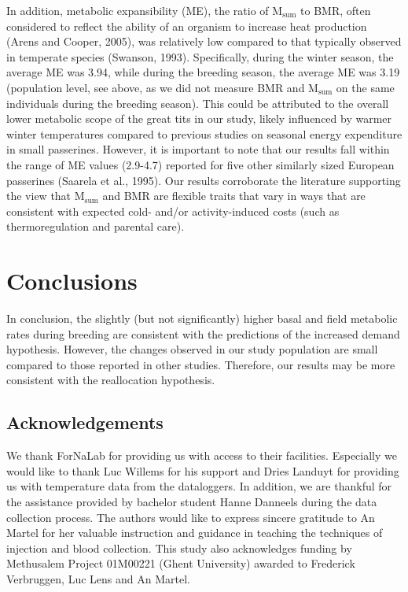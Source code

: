 \documentclass[10pt, twoside]{book} %
\begin{document}
In addition, metabolic expansibility (ME), the ratio of M$_{\text{sum}}$ to BMR, often considered to reflect the ability of an organism to increase heat production (Arens and Cooper, 2005), was relatively low compared to that typically observed in temperate species (Swanson, 1993). Specifically, during the winter season, the average ME was 3.94, while during the breeding season, the average ME was 3.19 (population level, see above, as we did not measure BMR and M$_{\text{sum}}$ on the same individuals during the breeding season). This could be attributed to the overall lower metabolic scope of the great tits in our study, likely influenced by warmer winter temperatures compared to previous studies on seasonal energy expenditure in small passerines. However, it is important to note that our results fall within the range of ME values (2.9-4.7) reported for five other similarly sized European passerines (Saarela et al., 1995). Our results corroborate the literature supporting the view that M$_{\text{sum}}$ and BMR are flexible traits that vary in ways that are consistent with expected cold- and/or activity-induced costs (such as thermoregulation and parental care).

\section{Conclusions}
In conclusion, the slightly (but not significantly) higher basal and field metabolic rates during breeding are consistent with the predictions of the increased demand hypothesis. However, the changes observed in our study population are small compared to those reported in other studies. Therefore, our results may be more consistent with the reallocation hypothesis.

\subsection*{Acknowledgements}
We thank ForNaLab for providing us with access to their facilities. Especially we would like to thank Luc Willems for his support and Dries Landuyt for providing us with temperature data from the dataloggers. In addition, we are thankful for the assistance provided by bachelor student Hanne Danneels during the data collection process. The authors would like to express sincere gratitude to An Martel for her valuable instruction and guidance in teaching the techniques of injection and blood collection. This study also acknowledges funding by Methusalem Project 01M00221 (Ghent University) awarded to Frederick Verbruggen, Luc Lens and An Martel.
\end{document}
